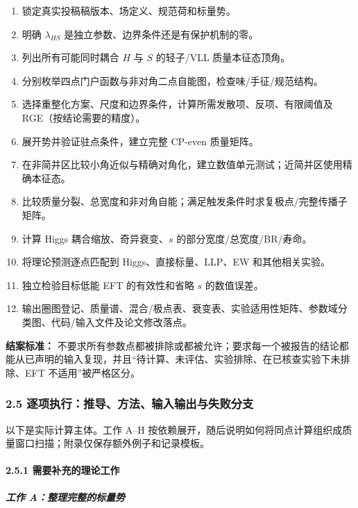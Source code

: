 \documentclass[
  chinese,
  UTF8]{ctexart}
\providecommand{\tightlist}{%
  \setlength{\itemsep}{0pt}\setlength{\parskip}{0pt}}
\begin{document}
\begin{enumerate}
\def\labelenumi{\arabic{enumi}.}
\tightlist
\item
  锁定真实投稿稿版本、场定义、规范荷和标量势。
\item
  明确 \(\lambda_{HS}\) 是独立参数、边界条件还是有保护机制的零。
\item
  列出所有可能同时耦合 \(H\) 与 \(S\) 的轻子/VLL 质量本征态顶角。
\item
  分别枚举四点门户函数与非对角二点自能图，检查味/手征/规范结构。
\item
  选择重整化方案、尺度和边界条件，计算所需发散项、反项、有限阈值及
  RGE（按结论需要的精度）。
\item
  展开势并验证驻点条件，建立完整 CP-even 质量矩阵。
\item
  在非简并区比较小角近似与精确对角化，建立数值单元测试；近简并区使用精确本征态。
\item
  比较质量分裂、总宽度和非对角自能；满足触发条件时求复极点/完整传播子矩阵。
\item
  计算 Higgs 耦合缩放、奇异衰变、\(s\) 的部分宽度/总宽度/BR/寿命。
\item
  将理论预测逐点匹配到 Higgs、直接标量、LLP、EW 和其他相关实验。
\item
  独立检验目标低能 EFT 的有效性和省略 \(s\) 的数值误差。
\item
  输出圈图登记、质量谱、混合/极点表、衰变表、实验适用性矩阵、参数域分类图、代码/输入文件及论文修改落点。
\end{enumerate}

\textbf{结案标准：}
不要求所有参数点都被排除或都被允许；要求每一个被报告的结论都能从已声明的输入复现，并且``待计算、未评估、实验排除、在已核查实验下未排除、EFT
不适用''被严格区分。

\subsubsection{2.5
逐项执行：推导、方法、输入输出与失败分支}\label{major-1-step-5}

以下是实际计算主体。工作 A--H
按依赖展开，随后说明如何将同点计算组织成质量窗口扫描；附录仅保存额外例子和记录模板。

\paragraph{2.5.1
需要补充的理论工作}\label{ux9700ux8981ux8865ux5145ux7684ux7406ux8bbaux5de5ux4f5c}

\subparagraph{工作
A：整理完整的标量势}\label{ux5de5ux4f5c-aux6574ux7406ux5b8cux6574ux7684ux6807ux91cfux52bf}
\end{document}
